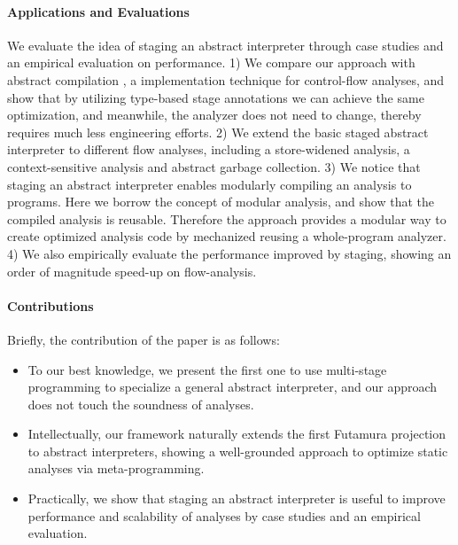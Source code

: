 \paragraph{Applications and Evaluations}
We evaluate the idea of staging an abstract interpreter through
case studies and an empirical evaluation on performance.
1) We compare our approach with abstract compilation
\cite{Boucher:1996:ACN:647473.727587}, a implementation technique for
control-flow analyses, and show that by utilizing type-based stage
annotations we can achieve the same optimization, and meanwhile,
the analyzer does not need to change, thereby requires much less
engineering efforts.
2) We extend the basic staged abstract interpreter to different flow
analyses, including a store-widened analysis, a context-sensitive
analysis and abstract garbage collection.
3) We notice that staging an abstract interpreter enables modularly
compiling an analysis to programs. Here we borrow the concept of
modular analysis, and show that the compiled analysis is reusable.
Therefore the approach provides a modular way to create optimized
analysis code by mechanized reusing a whole-program analyzer.
4) We also empirically evaluate the performance improved by staging,
showing an order of magnitude speed-up on flow-analysis.

\paragraph{Contributions} Briefly, the contribution of the paper is as follows:
\begin{itemize}[leftmargin=2em]
  \item To our best knowledge, we present the first one to use
    multi-stage programming to specialize a general abstract interpreter,
    and our approach does not touch the soundness of analyses.
  \item Intellectually, our framework naturally extends the first
    Futamura projection to abstract interpreters, showing a
    well-grounded approach to optimize static analyses via
    meta-programming.
  \item Practically, we show that staging an abstract interpreter is
    useful to improve performance and scalability of analyses by case
    studies and an empirical evaluation.
\end{itemize}

